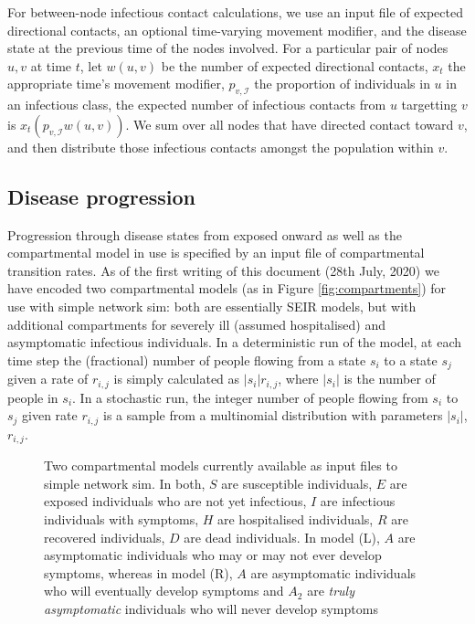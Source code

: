 \documentclass[11pt]{article}
\begin{document}
For between-node infectious contact calculations, we use an input file of expected directional contacts, an optional time-varying movement modifier, and the disease state at the previous time of the nodes involved.  For a particular pair of nodes $u, v$ at time $t$, let $w(u, v)$ be the number of expected directional contacts, $x_t$ the appropriate time's movement modifier, $p_{v,\mathcal{I}}$ the proportion of individuals in $u$ in an infectious class, the expected number of infectious contacts from $u$ targetting $v$ is $x_t(p_{v,\mathcal{I}}w(u, v))$.  We sum over all nodes that have directed contact toward $v$, and then distribute those infectious contacts amongst the population within $v$.

\subsection{Disease progression}
Progression through disease states from exposed onward as well as the compartmental model in use is specified by an input file of compartmental transition rates.   As of the first writing of this document (28th July, 2020) we have encoded two compartmental models (as in Figure \ref{fig:compartments}) for use with simple network sim: both are essentially SEIR models, but with additional compartments for severely ill (assumed hospitalised) and asymptomatic infectious individuals.  In a deterministic run of the model, at each time step the (fractional) number of people flowing from a state $s_i$ to a state $s_j$ given a rate of $r_{i,j}$ is simply calculated as $|s_i|r_{i,j}$, where $|s_i|$ is the number of people in $s_i$.  In a stochastic run, the integer number of people flowing from $s_i$ to $s_j$ given rate $r_{i,j}$ is a sample from a multinomial distribution with parameters $|s_i|$, $r_{i,j}$.

\begin{figure}[h!]
\caption{Two compartmental models currently available as input files to simple network sim.  In both, $S$ are susceptible individuals, $E$ are exposed individuals who are not yet infectious, $I$ are infectious individuals with symptoms,  $H$ are hospitalised individuals, $R$ are recovered individuals, $D$ are dead individuals. In model (L), $A$  are asymptomatic individuals who may or may not ever develop symptoms, whereas in model (R), $A$ are asymptomatic individuals who will eventually develop symptoms and \textbf{$A_2$} are \emph{truly asymptomatic} individuals who will never develop symptoms}
\end{figure}
\end{document}
